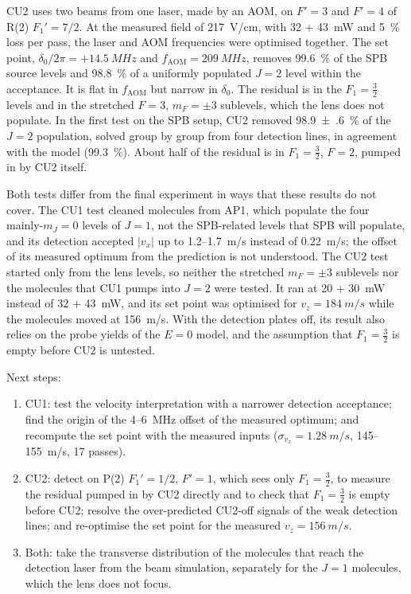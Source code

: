 \documentclass[11pt,a4paper,oneside]{report}
\newcommand{\fAOM}{f_{\mathrm{AOM}}}
\begin{document}
CU2 uses two beams from one laser, made by an AOM, on $F'=3$ and $F'=4$ of R(2) $F_1'=7/2$. At the measured field of \SI{217}{V/cm}, with
32 + \SI{43}{mW} and \SI{5}{\percent} loss per pass, the laser and AOM frequencies were optimised
together. The set point, $\delta_0/2\pi=+\SI{14.5}{MHz}$ and $\fAOM=\SI{209}{MHz}$, removes
\SI{99.6}{\percent} of the SPB source levels and \SI{98.8}{\percent} of a uniformly populated $J=2$
level within the acceptance. It is flat in $\fAOM$ but narrow in $\delta_0$. The residual is in the
$F_1=\tfrac32$ levels and in the stretched $F=3$, $m_F=\pm3$ sublevels, which the lens does not
populate. In the first test on the SPB setup, CU2 removed \SI{98.9(6)}{\percent} of the $J=2$
population, solved group by group from four detection lines, in agreement with the model
(\SI{99.3}{\percent}). About half of the residual is in $F_1=\tfrac32$, $F=2$, pumped in by CU2
itself.

Both tests differ from the final experiment in ways that these results do not cover. The CU1 test
cleaned molecules from AP1, which populate the four mainly-$m_J=0$ levels of $J=1$, not the
SPB-related levels that SPB will populate, and its detection accepted $|v_x|$ up to
1.2--\SI{1.7}{m/s} instead of \SI{0.22}{m/s}; the offset of its measured optimum from the prediction
is not understood. The CU2 test started only from the lens levels, so neither the stretched
$m_F=\pm3$ sublevels nor the molecules that CU1 pumps into $J=2$ were tested. It ran at 20 +
\SI{30}{mW} instead of 32 + \SI{43}{mW}, and its set point was optimised for
$v_z=\SI{184}{m/s}$ while the molecules moved at \SI{156}{m/s}. With the detection plates off, its
result also relies on the probe yields of the $E=0$ model, and the assumption that $F_1=\tfrac32$ is
empty before CU2 is untested.

Next steps:
\begin{enumerate}[itemsep=1pt]
  \item CU1: test the velocity interpretation with a narrower detection acceptance; find the origin of
        the 4--\SI{6}{MHz} offset of the measured optimum; and recompute the set point with the measured
        inputs ($\sigma_{v_x}=\SI{1.28}{m/s}$, 145--\SI{155}{m/s}, 17 passes).
  \item CU2: detect on P(2) $F_1'=1/2$, $F'=1$, which sees only $F_1=\tfrac32$, to measure the residual
        pumped in by CU2 directly and to check that $F_1=\tfrac32$ is empty before CU2; resolve the
        over-predicted CU2-off signals of the weak detection lines; and re-optimise the set point for the
        measured $v_z=\SI{156}{m/s}$.
  \item Both: take the transverse distribution of the molecules that reach the detection laser from
        the beam simulation, separately for the $J=1$ molecules, which the lens does not focus.
\end{enumerate}
\end{document}
